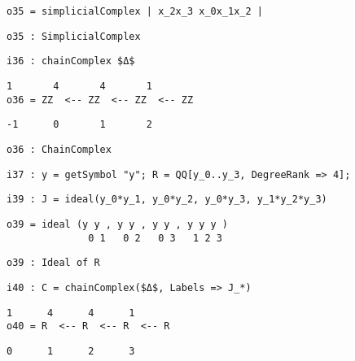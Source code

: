 \documentclass[12pt,leqno]{amsart}
\theoremstyle{definition}
\begin{document}
\begin{lstlisting}[xleftmargin=10pt, aboveskip=1.5pt, belowskip=1.5pt]
o35 = simplicialComplex | x_2x_3 x_0x_1x_2 |
\end{lstlisting}
\begin{lstlisting}[xleftmargin=10pt, aboveskip=1.5pt, belowskip=1.5pt]
o35 : SimplicialComplex
\end{lstlisting}
\begin{lstlisting}[xleftmargin=10pt, aboveskip=1.5pt, belowskip=1.5pt]
i36 : chainComplex $Δ$
\end{lstlisting}
\begin{lstlisting}[xleftmargin=10pt, lineskip=-10pt, aboveskip=1.5pt, belowskip=1.5pt]
        1       4       4       1
o36 = ZZ  <-- ZZ  <-- ZZ  <-- ZZ
\end{lstlisting}
\begin{lstlisting}[xleftmargin=10pt, aboveskip=1.5pt, belowskip=1.5pt]
      -1      0       1       2
\end{lstlisting}
\begin{lstlisting}[xleftmargin=10pt, aboveskip=1.5pt, belowskip=1.5pt]
o36 : ChainComplex
\end{lstlisting}
\begin{lstlisting}[xleftmargin=10pt, aboveskip=1.5pt, belowskip=1.5pt]
i37 : y = getSymbol "y"; R = QQ[y_0..y_3, DegreeRank => 4];
\end{lstlisting}
\begin{lstlisting}[xleftmargin=10pt, aboveskip=1.5pt, belowskip=1.5pt]
i39 : J = ideal(y_0*y_1, y_0*y_2, y_0*y_3, y_1*y_2*y_3)
\end{lstlisting}
\begin{lstlisting}[xleftmargin=10pt, lineskip=-10pt, aboveskip=1.5pt, belowskip=1.5pt]
o39 = ideal (y y , y y , y y , y y y )
              0 1   0 2   0 3   1 2 3
\end{lstlisting}
\begin{lstlisting}[xleftmargin=10pt, aboveskip=1.5pt, belowskip=1.5pt]
o39 : Ideal of R
\end{lstlisting}
\begin{lstlisting}[xleftmargin=10pt, aboveskip=1.5pt, belowskip=1.5pt]
i40 : C = chainComplex($Δ$, Labels => J_*)
\end{lstlisting}
\begin{lstlisting}[xleftmargin=10pt, lineskip=-10pt, aboveskip=1.5pt, belowskip=1.5pt]
       1      4      4      1
o40 = R  <-- R  <-- R  <-- R
\end{lstlisting}
\begin{lstlisting}[xleftmargin=10pt, aboveskip=1.5pt, belowskip=1.5pt]                           
      0      1      2      3
\end{lstlisting}
\end{document}
